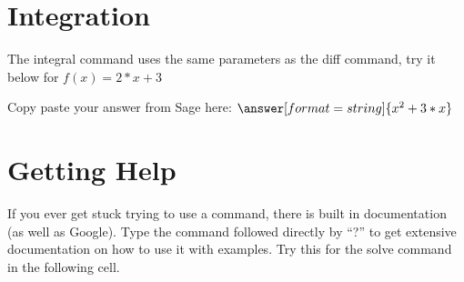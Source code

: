 \documentclass{ximera}
\begin{document}
\section{Integration}
The integral command uses the same parameters as the diff command, try it below for $f(x)=2*x+3$
\begin{onlineOnly}
\begin{sageCell}

\end{sageCell}
\end{onlineOnly}
\begin{question}
Copy paste your answer from Sage here:
$\answer[format=string]{x^2 + 3*x}$
\end{question}
\section{Getting Help}
If you ever get stuck trying to use a command, there is built in documentation (as well as Google). Type the command followed directly by ``?'' to get extensive documentation on how to use it with examples. Try this for the solve command in the following cell.
\begin{onlineOnly}
\begin{sageCell}

\end{sageCell}
\end{onlineOnly}
\end{document}
